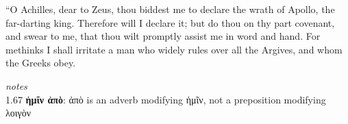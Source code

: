 \documentclass{ransom}
\begin{document}
“O Achilles, dear to Zeus, thou biddest me to declare the wrath of
Apollo, the far-darting king. Therefore will I declare it; but do thou
on thy part covenant, and swear to me, that thou wilt promptly assist
me in word and hand. For methinks I shall irritate a man who widely
rules over all the Argives, and whom the Greeks obey.
    \par
    \textit{notes}\\
    1.67 \textbf{ἡμῖν ἀπὸ}: ἀπὸ is an adverb modifying ἡμῖν, not a preposition modifying λοιγὸν
    \begin{vocabpage}
\begin{vocabcommon}
\\\\\\\\\\\\\\\\\\\\\\\\\\\\\\\\\\\\\\\\\\\\\\\\\end{vocabcommon}
\begin{vocabuncommon}

\end{vocabuncommon}
\end{vocabpage}
\end{document}
